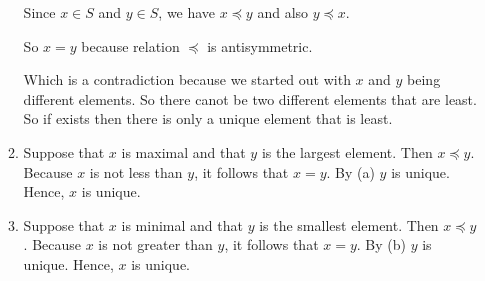 \documentclass{../../cls/sig-alternate-05-2015}
\begin{document}
\begin{enumerate}
\begin{enumerate}
		Since $x \in S$ and $y\in S$, we have $x\preceq y$ and also $y \preceq x$. 
		
		So $x=y$ because relation $\preceq$ is antisymmetric.
		
		Which is a contradiction because we started out with $x$ and $y$ being different
		elements. So there canot be two different elements that are least. So if
		exists then there is only a unique element that is least.
		
		\item Suppose that $x$ is maximal and that $y$ is the largest
		element. Then $x \preceq y$. Because $x$ is not less than $y$, it follows
		that $x = y$. By (a) $y$ is unique. Hence, $x$ is
		unique.
		\item Suppose that $x$ is minimal and that $y$ is the smallest
		element. Then $x \preceq y$. Because $x$ is not greater than $y$, it follows
		 that $x = y$. By (b) $y$ is unique. Hence, $x$ is unique.
	\end{enumerate}
\end{enumerate}
\end{document}
